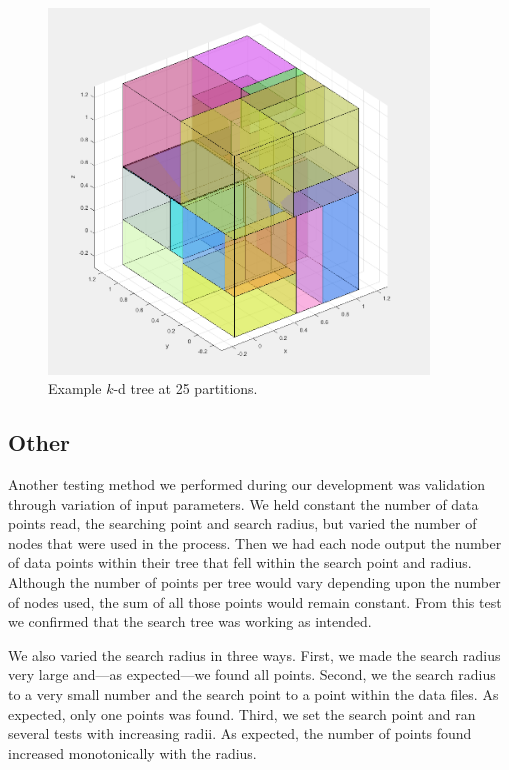 \documentclass{article}
\begin{document}
\begin{figure}[b!]
	\includegraphics[width=0.9\textwidth]{images/squares.png}
	\caption{Example $k$-d tree at 25 partitions.}
	\label{square}
\end{figure}

\subsection{Other}
Another testing method we performed during our development was validation through variation of input parameters. We held constant the number of data points read, the searching point and search radius, but varied the number of nodes that were used in the process. Then we had each node output the number of data points within their tree that fell within the search point and radius. Although the number of points per tree would vary depending upon the number of nodes used, the sum of all those points would remain constant. From this test we confirmed that the search tree was working as intended. 

We also varied the search radius in three ways. First, we made the search radius very large and---as expected---we found all points. Second, we the search radius to a very small number and the search point to a point within the data files. As expected, only one points was found. Third, we set the search point and ran several tests with increasing radii. As expected, the number of points found increased monotonically with the radius.
\end{document}
